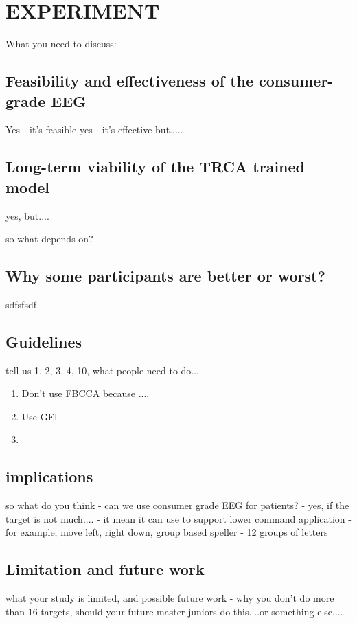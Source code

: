 \setlength{\footskip}{8mm}

\chapter{EXPERIMENT}


What you need to discuss:

\section{Feasibility and effectiveness of the consumer-grade EEG}
Yes - it's feasible
yes - it's effective but.....

\section{Long-term viability of the TRCA trained model}
yes, but....

so what depends on?

\section{Why some participants are better or worst?}
sdfsfsdf

\section{Guidelines}
tell us 1, 2, 3, 4, 10, what people need to do...

\begin{enumerate}
    \item Don't use FBCCA because ....
    \item Use GEl 
    \item 
\end{enumerate}

\section{implications}
so what do you think - can we use consumer grade EEG for patients? 
- yes, if the target is not much....
- it mean it can use to support lower command application
- for example, move left, right down, group based speller - 12 groups of letters

\section{Limitation and future work}
what your study is limited, and possible future work
- why you don't do more than 16 targets, should your future master juniors do this....or something else....



